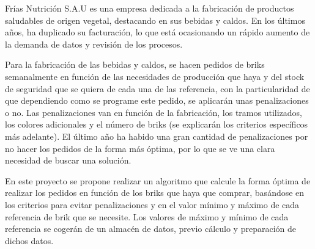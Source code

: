 

Frías Nutrición S.A.U es una empresa dedicada a la fabricación de productos saludables de origen vegetal, destacando en sus bebidas y caldos. En los últimos años, ha duplicado su facturación, lo que está ocasionando un rápido aumento de la demanda de datos y revisión de los procesos. 


Para la fabricación de las bebidas y caldos, se hacen pedidos de briks semanalmente en función de las necesidades de producción que haya y del stock de seguridad que se quiera de cada una de las referencia, con la particularidad de que dependiendo como se programe este pedido, se aplicarán unas penalizaciones o no. Las penalizaciones van en función de la fabricación, los tramos utilizados, los colores adicionales y el número de briks (se explicarán los criterios específicos más adelante). El último año ha habido una gran cantidad de penalizaciones por no hacer los pedidos de la forma más óptima, por lo que se ve una clara necesidad de buscar una solución. 


En este proyecto se propone realizar un algoritmo que calcule la forma óptima de realizar los pedidos en función de los briks que haya que comprar, basándose en los criterios para evitar penalizaciones y en el valor mínimo y máximo de cada referencia de brik que se necesite. Los valores de máximo y mínimo de cada referencia se cogerán de un almacén de datos, previo cálculo y preparación de dichos datos. 
